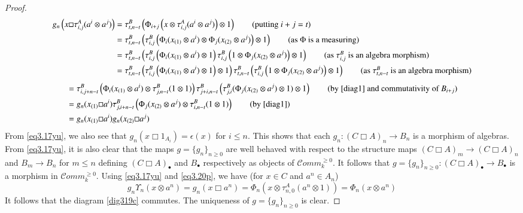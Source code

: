 \documentclass[10pt, colorlinks]{article}
\numberwithin{equation}{section} \DeclareMathSizes{2}{10}{12}{13}
\begin{document}
\begin{proof}
\begin{align*}
    g_n\left(x\Box \tau^A_{i,j}(a^i\otimes a^j)\right)
            &=\tau_{t,n-t}^B\left(\Phi_{i+j}\left(x\otimes \tau_{i,j}^A(a^i\otimes a^j)\right)\otimes 1\right)\tag{putting $i+j=t$}\\
            &=\tau_{t,n-t}^B\left(\tau_{i,j}^B\left(\Phi_{i}(x_{(1)}\otimes a^i) \otimes \Phi_j(x_{(2)}\otimes a^j)\right)\otimes 1\right)\tag{as $\Phi$ is a measuring}\\
            &=\tau_{t,n-t}^B\left(\tau_{i,j}^B\left(\Phi_{i}(x_{(1)}\otimes a^i) \otimes 1\right) \tau_{i,j}^B\left(1 \otimes \Phi_j(x_{(2)}\otimes a^j)\right)\otimes 1\right)\tag{as $\tau^B_{i,j}$ is an algebra morphism}\\
            &=\tau_{t,n-t}^B\left(\tau_{i,j}^B\left(\Phi_{i}(x_{(1)}\otimes a^i) \otimes 1\right)\otimes 1\right)\tau_{t,n-t}^B\left( \tau_{i,j}^B\left(1 \otimes \Phi_j(x_{(2)}\otimes a^j)\right)\otimes 1\right)\tag{as $\tau^B_{t,n-t}$ is an algebra morphism}
            \end{align*}
            \begin{align*}
            &=\tau_{i,j+n-t}^B\left(\Phi_{i}(x_{(1)}\otimes a^i) \otimes \tau_{j,n-t}^B (1\otimes 1)\right)\tau_{j+i,n-t}^B\left( \tau_{j,i}^B( \Phi_j(x_{(2)}\otimes a^j)\otimes 1)\otimes 1\right)\tag{by \eqref{diag1} and commutativity of $B_{i+j}$}\\
            &=g_n(x_{(1)}\Box a^i)\tau_{j,i+n-t}^B\left( \Phi_j(x_{(2)}\otimes a^j)\otimes\tau_{i,n-t}^B( 1\otimes 1)\right)\tag{by \eqref{diag1}}\\
            &=g_n(x_{(1)}\Box a^i)g_n(x_{(2)}\Box a^j)
\end{align*} From \eqref{eq3.17yu}, we also see  that $g_n(x\Box 1_{A_i})=\epsilon(x)$ for $i\leq n$. This shows that each $g_n:(C\Box A)_n\longrightarrow B_n$ is a   morphism of algebras. From \eqref{eq3.17yu}, it is also clear that the maps $g=\{g_n\}_{n\geq 0}$ are well behaved with respect to the structure maps 
$(C\Box A)_m\longrightarrow (C\Box A)_n$ and $B_m\longrightarrow B_n$ for $m\leq n$ defining $(C\Box A)_\bullet$ and $B_\bullet$ respectively as objects of $\mathcal Comm_k^{\geq 0}$. It follows that $g=\{g_n\}_{n\geq 0}:(C\Box A)_\bullet\longrightarrow B_\bullet$ is a morphism in $\mathcal Comm_k^{\geq 0}$. Using \eqref{eq3.17yu} and \eqref{eq3.20p}, we have (for $x\in C$ and $a^n\in A_n$)
\begin{equation}
g_n\Upsilon_n(x\otimes a^n)=g_n(x\Box a^n)=\Phi_n(x\otimes \tau^A_{n,0}(a^n\otimes 1))=\Phi_n(x\otimes a^n)
\end{equation} It follows that the diagram \eqref{dig319c} commutes. The uniqueness of $g=\{g_n\}_{n\geq 0}$ is clear. 
    \end{proof}
\end{document}
